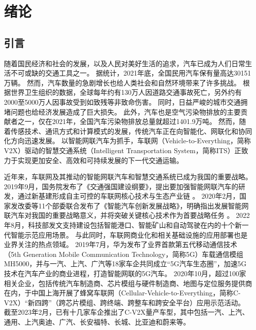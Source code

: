 \chapter{绪论}
\section{引言}\label{section 1-1}

随着国民经济和社会的发展，以及人民对美好生活的追求，汽车已成为人们日常生活不可或缺的交通工具之一。
据统计，2021年底，全国民用汽车保有量高达30151万辆\cite{gou2022zhong}。
然而，汽车数量的急剧增长也给人类社会和自然环境带来了许多挑战。
根据世界卫生组织的数据，全球每年约有130万人因道路交通事故死亡，另外约有2000至5000万人因事故受到如致残等非致命伤害\cite{shi2022dao}。
同时，日益严峻的城市交通拥堵问题也给经济发展造成了巨大损失。
此外，汽车也是空气污染物排放的主要贡献者之一，仅在2021年，全国汽车污染物排放总量就超过1401.9万吨\cite{shen2022zhong}。
然而，随着传感技术、通讯方式和计算模式的发展，传统汽车正在向智能化、网联化和协同化方向迅速发展。
以智能网联汽车为抓手，车联网（Vehicle-to-Everything，简称V2X）驱动的智慧交通系统（Intelligent Transportation System，简称ITS）正致力于实现更加安全、高效和可持续发展的下一代交通运输。

近年来，车联网及其推动的智能网联汽车和智慧交通系统已成为我国的重要战略。
2019年9月，国务院发布了《交通强国建设纲要》，提出要加强智能网联汽车的研发，通过新基建形成自主可控的车联网核心技术与生态产业链 \cite{zhong2019jiao}。
2020年2月，国家发改委等11个部委联合发布了《智能汽车创新发展战略》，明确指出发展智能网联汽车对我国的重要战略意义，并将突破关键核心技术作为首要战略任务 \cite{guo2020zi}。
2022年8月，科技部发文支持建设包括智能港口、智能矿山和自动驾驶在内的十个新一代智能示范应用场景\cite{ke2022ke}。
与此同时，车联网商业化和相关基础设施的应用部署也是业界关注的热点领域。
2019年7月，华为发布了业界首款第五代移动通信技术（5th Generation Mobile Communication Technology，简称5G）车载通信模组MH5000，并与一汽、上汽、广汽等18家车企共同成立“5G汽车生态圈”，加速5G技术在汽车产业的商业进程，打造智能网联的5G汽车。
2020年10月，超过100家相关企业，包括传统汽车制造商、芯片模组与硬件制造商、地图与定位服务提供商在内，于中国上海开展了蜂窝车联网（Cellular-Vehicle-to-Everything，简称C-V2X）“新四跨”（跨芯片模组、跨终端、跨整车和跨安全平台）应用示范活动。
截至2023年2月，已有十几家车企推出了C-V2X量产车型，其中包括一汽、上汽、通用、上汽奥迪、广汽、长安福特、长城、比亚迪和蔚来等。


